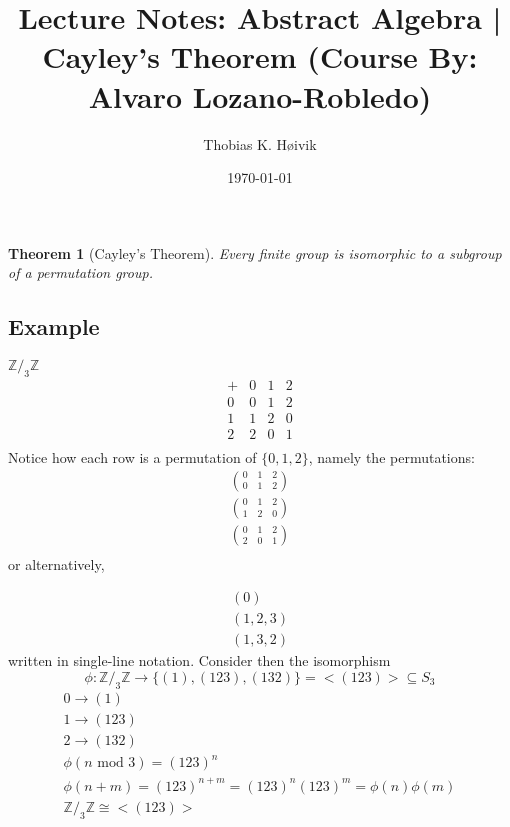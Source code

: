 \documentclass[12pt]{article}
\title{Lecture Notes: Abstract Algebra | Cayley's Theorem (Course By: Alvaro Lozano-Robledo)}
\author{Thobias K. Høivik}
\date{\today}
\newtheorem{theorem}{Theorem}
\begin{document}
\maketitle
\begin{theorem}[Cayley's Theorem]\label{thm:cayley}
    Every finite group is isomorphic to a subgroup of a permutation group.
\end{theorem}

\subsection*{Example}
\(\mathbb Z/_3\mathbb Z\)
\[
\begin{array}{c|ccc}
+ & 0 & 1 & 2 \\
\hline
0 & 0 & 1 & 2 \\
1 & 1 & 2 & 0 \\
2 & 2 & 0 & 1 \\
\end{array}
\]
Notice how each row is a permutation of \(\{0,1,2\}\), 
namely the permutations:
\begin{gather*}
    \binom{0 \quad 1 \quad 2}{0 \quad 1 \quad 2} \\
    \binom{0 \quad 1 \quad 2}{1 \quad 2 \quad 0} \\
    \binom{0 \quad 1 \quad 2}{2 \quad 0 \quad 1} \\
\end{gather*}
or alternatively,

\begin{gather*}
    (0) \\ 
    (1,2,3) \\ 
    (1,3,2)
\end{gather*}
written in single-line notation.
Consider then the isomorphism 
\[
    \phi : \mathbb Z /_3 \mathbb Z 
    \to \{(1),(123),(132)\} = <(123)>\subseteq S_3
\]
\begin{gather*}
    0 \to (1) \\
    1 \to (123) \\ 
    2 \to (132) \\ 
    \phi (n \text{ mod } 3) = (123)^n \\ 
    \phi(n + m) = (123)^{n+m} = (123)^n (123)^m = \phi(n) \phi(m) \\ 
    \mathbb Z /_3 \mathbb Z \cong <(123)>
\end{gather*}
\end{document}

